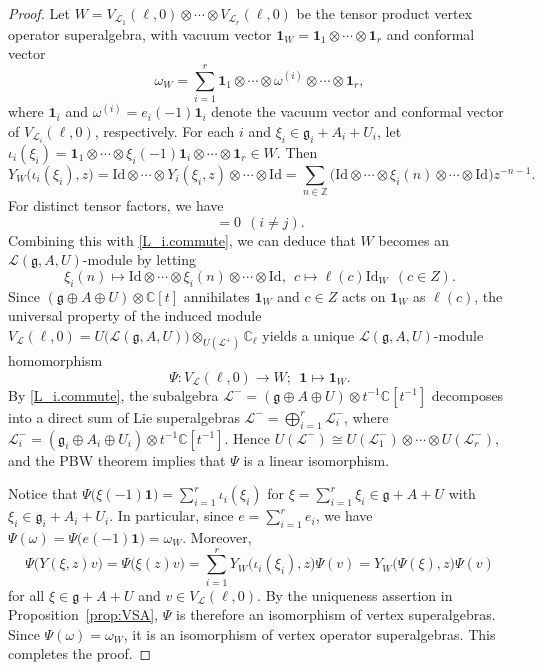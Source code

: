 \documentclass[12pt]{article}
\numberwithin{equation}{section}
\theoremstyle{definition}
\theoremstyle{plain}
\newcommand{\bC}{\ensuremath{\mathbb{C}}}
\newcommand{\bZ}{\ensuremath{\mathbb{Z}}}
\newcommand{\fg}{\mathfrak{g}}
\newcommand{\Id}{\mathrm{Id }}
\newcommand{\cL}{\ensuremath{\mathcal{L}}}
\newcommand{\bone}{\mathbf{1 }}
\begin{document}
\begin{proof}
Let $W=V_{\cL_1}(\ell,0)\otimes\cdots\otimes V_{\cL_r}(\ell,0)$ be the tensor product vertex operator superalgebra, with vacuum vector $\bone_W=\bone_1\otimes\cdots\otimes\bone_r$ and conformal vector
\begin{equation*}
    \omega_W=\sum_{i=1}^r\bone_1\otimes\cdots\otimes\omega^{(i)}\otimes\cdots\otimes\bone_r,
\end{equation*}
where $\bone_i$ and $\omega^{(i)}=e_i(-1)\bone_i$ denote the vacuum vector and conformal vector of $V_{\cL_i}(\ell,0)$, respectively. For each $i$ and $\xi_i\in\fg_i+A_i+U_i$, let $\iota_i(\xi_i)=\bone_1\otimes\cdots \otimes\xi_i(-1)\bone_i\otimes\cdots\otimes\bone_r\in W$. Then
\begin{equation*}
    Y_W\big(\iota_i(\xi_i),z\big)=\Id\otimes\cdots\otimes Y_i(\xi_i,z)\otimes\cdots\otimes\Id=\sum_{n\in\bZ}\big(\Id\otimes\cdots\otimes\xi_i(n)\otimes\cdots\otimes\Id\big)z^{-n-1}.
\end{equation*}
For distinct tensor factors, we have
\begin{equation*}
    [Y_W\big(\iota_i(\xi_i),z_1\big),Y_W\big(\iota_j(\xi_j),z_2\big)]=0\ \ (i\ne j).
\end{equation*}
Combining this with \eqref{L_i.commute}, we can deduce that $W$ becomes an $\cL(\fg,A,U)$-module by letting
\begin{equation*}
    \xi_i(n)\longmapsto\Id\otimes\cdots\otimes\xi_i(n)\otimes\cdots\otimes\Id,\ \ c\longmapsto\ell(c)\Id_W\ \ (c \in Z).
\end{equation*}
Since $(\fg\oplus A\oplus U)\otimes\bC[t]$ annihilates $\bone_W$ and $c\in Z$ acts on $\bone_W$ as $\ell(c)$, the universal property of the induced module $V_{\cL}(\ell,0)=U\big(\cL(\fg,A,U)\big)\otimes_{U(\cL^+)}\bC_\ell$ yields a unique $\cL(\fg,A,U)$-module homomorphism
\begin{equation*}
    \Psi:V_{\cL}(\ell,0)\longrightarrow W;\ \ \bone\longmapsto\bone_W.
\end{equation*}
By \eqref{L_i.commute}, the subalgebra $\cL^-=(\fg\oplus A\oplus U)\otimes t^{-1}\bC[t^{-1}]$ decomposes into a direct sum of Lie superalgebras $\cL^-=\bigoplus_{i=1}^r\cL_i^-$, where $\cL_i^-=(\fg_i\oplus A_i\oplus U_i)\otimes t^{-1}\bC[t^{-1}]$. Hence $U(\cL^-)\cong U(\cL_1^-)\otimes\cdots\otimes U(\cL_r^-)$, and the PBW theorem implies that $\Psi$ is a linear isomorphism.

Notice that $\Psi\big(\xi(-1)\bone\big)=\sum_{i=1}^r\iota_i(\xi_i)$ for $\xi=\sum_{i=1}^r\xi_i\in\fg+A+U$ with $\xi_i\in\fg_i+A_i+U_i$. In particular, since $e=\sum_{i=1}^r e_i$, we have $\Psi(\omega)=\Psi\big(e(-1)\bone\big)=\omega_W$. Moreover,
\begin{equation*}
    \Psi\big(Y(\xi, z)v\big)=\Psi\big(\xi(z)v\big)=\sum_{i=1}^r Y_W\big(\iota_i(\xi_i),z\big)\Psi(v)=Y_W\big(\Psi(\xi),z\big)\Psi(v)
\end{equation*}
for all $\xi\in\fg+A+U$ and $v\in V_{\cL}(\ell,0)$. By the uniqueness assertion in Proposition~\ref{prop:VSA}, $\Psi$ is therefore an isomorphism of vertex superalgebras. Since $\Psi(\omega)=\omega_W$, it is an isomorphism of vertex operator superalgebras. This completes the proof.
\end{proof}
\end{document}
